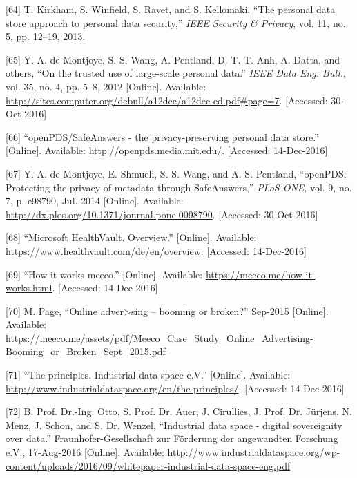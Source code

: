 \documentclass[12pt,english,a4paper,titlepage,cleardoublepage=empty,dottedtoc]{report}
\begin{document}
\hypertarget{ref-paper_2014_personal-data-store-approach}{}
{[}64{]} T. Kirkham, S. Winfield, S. Ravet, and S. Kellomaki, ``The
personal data store approach to personal data security,'' \emph{IEEE
Security \& Privacy}, vol. 11, no. 5, pp. 12--19, 2013.

\hypertarget{ref-paper_2012_openpds_on-trusted-use-of-large-scale-personal-data}{}
{[}65{]} Y.-A. de Montjoye, S. S. Wang, A. Pentland, D. T. T. Anh, A.
Datta, and others, ``On the trusted use of large-scale personal data.''
\emph{IEEE Data Eng. Bull.}, vol. 35, no. 4, pp. 5--8, 2012
{[}Online{]}. Available:
\url{http://sites.computer.org/debull/a12dec/a12dec-cd.pdf\#page=7}.
{[}Accessed: 30-Oct-2016{]}

\hypertarget{ref-web_mit_openpds-safeanswers-project-page}{}
{[}66{]} ``openPDS/SafeAnswers - the privacy-preserving personal data
store.'' {[}Online{]}. Available: \url{http://openpds.media.mit.edu/}.
{[}Accessed: 14-Dec-2016{]}

\hypertarget{ref-paper_2014_openpds_protecting-privacy-of-meta-data-through-safeanswers}{}
{[}67{]} Y.-A. de Montjoye, E. Shmueli, S. S. Wang, and A. S. Pentland,
``openPDS: Protecting the privacy of metadata through SafeAnswers,''
\emph{PLoS ONE}, vol. 9, no. 7, p. e98790, Jul. 2014 {[}Online{]}.
Available: \url{http://dx.plos.org/10.1371/journal.pone.0098790}.
{[}Accessed: 30-Oct-2016{]}

\hypertarget{ref-web_microsoft_healthvault}{}
{[}68{]} ``Microsoft HealthVault. Overview.'' {[}Online{]}. Available:
\url{https://www.healthvault.com/de/en/overview}. {[}Accessed:
14-Dec-2016{]}

\hypertarget{ref-web_meeco_how-it-works}{}
{[}69{]} ``How it works meeco.'' {[}Online{]}. Available:
\url{https://meeco.me/how-it-works.html}. {[}Accessed: 14-Dec-2016{]}

\hypertarget{ref-slides_2015_meeco-case-study}{}
{[}70{]} M. Page, ``Online adver\textgreater{}sing -- booming or
broken?'' Sep-2015 {[}Online{]}. Available:
\url{https://meeco.me/assets/pdf/Meeco_Case_Study_Online_Advertising-Booming_or_Broken_Sept_2015.pdf}

\hypertarget{ref-web_industrial-data-space}{}
{[}71{]} ``The principles. Industrial data space e.V.'' {[}Online{]}.
Available: \url{http://www.industrialdataspace.org/en/the-principles/}.
{[}Accessed: 14-Dec-2016{]}

\hypertarget{ref-whitepaper_2016_industrial-data-space}{}
{[}72{]} B. Prof. Dr.-Ing. Otto, S. Prof. Dr. Auer, J. Cirullies, J.
Prof. Dr. Jürjens, N. Menz, J. Schon, and S. Dr. Wenzel, ``Industrial
data space - digital sovereignity over data.'' Fraunhofer-Gesellschaft
zur Förderung der angewandten Forschung e.V., 17-Aug-2016 {[}Online{]}.
Available:
\url{http://www.industrialdataspace.org/wp-content/uploads/2016/09/whitepaper-industrial-data-space-eng.pdf}
\end{document}
